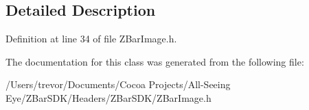 \subsection{Detailed Description}


Definition at line 34 of file ZBarImage.h.



The documentation for this class was generated from the following file:\begin{DoxyCompactItemize}
\item 
/Users/trevor/Documents/Cocoa Projects/All-\/Seeing Eye/ZBarSDK/Headers/ZBarSDK/ZBarImage.h\end{DoxyCompactItemize}
